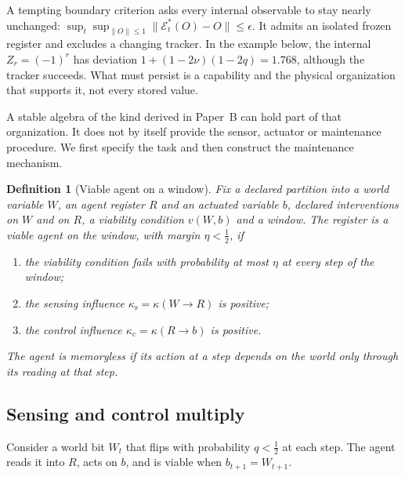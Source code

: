 \documentclass[11pt,a4paper]{article}
\newtheorem{definition}{Definition}[section]
\begin{document}
A tempting boundary criterion asks every internal observable to stay nearly
unchanged: \(\sup_t\sup_{\|O\|\le1}\|\mathcal E_t^*(O)-O\|\le\epsilon\).
It admits an isolated frozen register and excludes a changing tracker.
In the example below, the internal \(Z_r=(-1)^r\) has deviation
\(1+(1-2\nu)(1-2q)=1.768\), although the tracker succeeds.
What must persist is a capability and the physical organization that
supports it, not every stored value.

A stable algebra of the kind derived in Paper~B can hold part of that
organization. It does not by itself provide the sensor, actuator or
maintenance procedure. We first specify the task and then construct the
maintenance mechanism.

\begin{definition}[Viable agent on a window]
\label{def:agent}
Fix a declared partition into a world variable $W$, an agent register $R$ and an actuated variable $b$, declared interventions on $W$ and on $R$, a viability condition $v(W,b)$ and a window. The register is a viable agent on the window, with margin $\eta<\frac12$, if
\begin{enumerate}
\item the viability condition fails with probability at most $\eta$ at every step of the window;
\item the sensing influence $\kappa_{\mathrm s}=\kappa(W\to R)$ is positive;
\item the control influence $\kappa_{\mathrm c}=\kappa(R\to b)$ is positive.
\end{enumerate}
The agent is memoryless if its action at a step depends on the world only through its reading at that step.
\end{definition}

\subsection{Sensing and control multiply}

Consider a world bit $W_t$ that flips with probability $q<\frac12$ at each step. The agent reads it into $R$, acts on $b$, and is viable when $b_{t+1}=W_{t+1}$.
\end{document}
